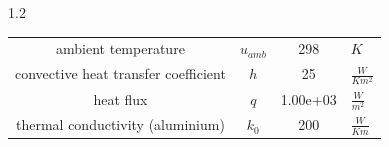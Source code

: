 \documentclass[preview]{standalone}
\begin{document}
\begin{spacing}{1.2}
\begin{tabular}{cccl}
\toprule
ambient temperature & $u_{amb}$ & 298 & $K$ \\ 
convective heat transfer coefficient & $h$ & 25 & $\frac{W}{K m^2}$ \\ 
heat flux & $q$ & 1.00e+03 & $\frac{W}{m^2}$ \\ 
thermal conductivity (aluminium) & $k_{0}$ & 200 & $\frac{W}{K m}$ \\ 
\bottomrule
\end{tabular}
\end{spacing}
\end{document}

